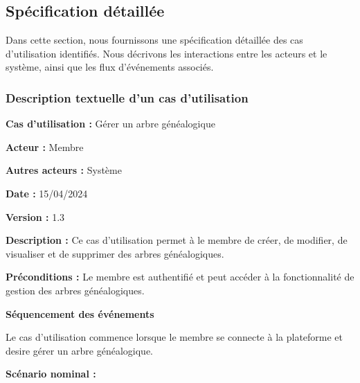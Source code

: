 \subsection{Spécification détaillée }
Dans cette section, nous fournissons une spécification détaillée des cas
d’utilisation identifiés. Nous décrivons les interactions entre les acteurs et
le système, ainsi que les flux d’événements associés.

\subsubsection{Description textuelle d'un cas d'utilisation}
\textbf{Cas d’utilisation :} Gérer un arbre généalogique

\textbf{Acteur :} Membre

\textbf{Autres acteurs :} Système

\textbf{Date :} 15/04/2024

\textbf{Version :} 1.3

\textbf{Description :} Ce cas d’utilisation permet à le membre de créer,
de modifier, de visualiser et de supprimer des arbres généalogiques.

\textbf{Préconditions :} Le membre est authentifié et peut accéder à la
fonctionnalité de gestion des arbres généalogiques.

\textbf{Séquencement des événements}

Le cas d’utilisation commence lorsque le membre se connecte à la plateforme
et desire gérer un arbre généalogique.

\textbf{Scénario nominal :}


